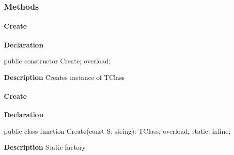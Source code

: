 \documentclass{report}
\newif\ifpdf
\begin{document}
\subsubsection*{\large{\textbf{Methods}}\normalsize\hspace{1ex}\hfill}
\paragraph*{Create}\hspace*{\fill}

\label{ok_parse_impl.TClass-Create}
\begin{list}{}{
\setlength{\itemindent}{0cm}
\setlength{\listparindent}{0cm}
\setlength{\leftmargin}{\evensidemargin}
\addtolength{\leftmargin}{\tmplength}
\settowidth{\labelsep}{X}
\addtolength{\leftmargin}{\labelsep}
\setlength{\labelwidth}{\tmplength}
}
\item[\textbf{Declaration}\hfill]
\ifpdf
\begin{flushleft}
\fi
\begin{ttfamily}
public constructor Create; overload;\end{ttfamily}

\ifpdf
\end{flushleft}
\fi

\par
\item[\textbf{Description}]
Creates instance of TClass

\end{list}
\paragraph*{Create}\hspace*{\fill}

\label{ok_parse_impl.TClass-Create}
\begin{list}{}{
\setlength{\itemindent}{0cm}
\setlength{\listparindent}{0cm}
\setlength{\leftmargin}{\evensidemargin}
\addtolength{\leftmargin}{\tmplength}
\settowidth{\labelsep}{X}
\addtolength{\leftmargin}{\labelsep}
\setlength{\labelwidth}{\tmplength}
}
\item[\textbf{Declaration}\hfill]
\ifpdf
\begin{flushleft}
\fi
\begin{ttfamily}
public class function Create(const S: string): TClass; overload; static; inline;\end{ttfamily}

\ifpdf
\end{flushleft}
\fi

\par
\item[\textbf{Description}]
Static factory

\end{list}
\end{document}
